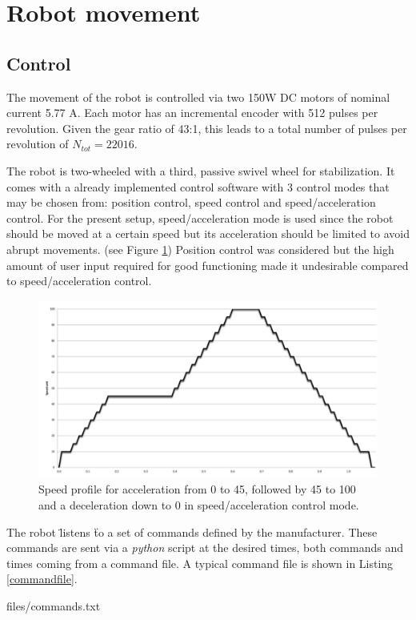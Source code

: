 \section{Robot movement}

\subsection{Control}
\label{sec:movement}

The movement of the robot is controlled via two 150W DC motors of nominal current 5.77 A. Each motor has an incremental encoder with 512 pulses per revolution. Given the gear ratio of 43:1, this leads to a total number of pulses per revolution of $N_{tot}=22016$.

The robot is two-wheeled with a third, passive swivel wheel for stabilization. It comes with a already implemented control software with 3 control modes that may be chosen from: position control, speed control and speed/acceleration control. 
For the present setup, speed/acceleration mode is used since the robot should be moved at a certain speed but its acceleration should be limited to avoid abrupt movements. (see Figure \ref{fig:acceleration})
Position control was considered but the high amount of user input required for good functioning made it undesirable compared to speed/acceleration control.

\begin{figure}[htb]
    \centering
    \includegraphics[width=0.5\linewidth]{files/Acceleration.png}
    \caption{Speed profile for acceleration from 0 to 45, followed by 45 to 100 and a deceleration down to 0 in speed/acceleration control mode.}
    \label{fig:acceleration}
\end{figure}

The robot \" listens \" to a set of commands defined by the manufacturer. These commands are sent via a \textit{python} script at the desired times, both commands and times coming from a command file. A typical command file is shown in Listing \ref{commandfile}.

\begin{center}
\begin{minipage}{0.9\linewidth}
    \begin{center}
\begin{lstinputlisting}[caption=\texttt{commands.txt}., label=commandfile, frame=none,numbers=none,xleftmargin=.45\textwidth]{files/commands.txt}
\end{lstinputlisting}
\end{center}
\end{minipage}
\end{center}

